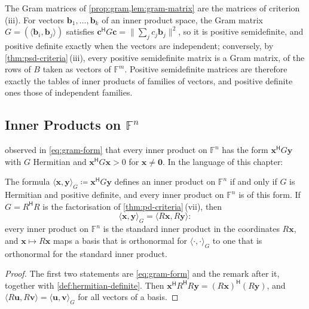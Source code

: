The Gram matrices of \cref{prop:gram,lem:gram-matrix} are the matrices of criterion (iii). For vectors $\mathbf b_1,\ldots,\mathbf b_k$ of an inner product space, the Gram matrix $G=(\langle\mathbf b_i,\mathbf b_j\rangle)$ satisfies $\mathbf c^{\mathsf H}G\mathbf c=\|\sum_jc_j\mathbf b_j\|^2$, so it is positive semidefinite, and positive definite exactly when the vectors are independent; conversely, by \cref{thm:psd-criteria}\,(iii), every positive semidefinite matrix is a Gram matrix, of the rows of $B$ taken as vectors of $\mathbb F^m$. Positive semidefinite matrices are therefore exactly the tables of inner products of families of vectors, and positive definite ones those of independent families.

\subsection{Inner Products on \texorpdfstring{$\mathbb F^n$}{Fn}}

 observed in \eqref{eq:gram-form} that every inner product on $\mathbb F^n$ has the form $\mathbf x^{\mathsf H}G\mathbf y$ with $G$ Hermitian and $\mathbf x^{\mathsf H}G\mathbf x>0$ for $\mathbf x\ne\mathbf 0$. In the language of this chapter:

\begin{corollary}
\label{cor:inner-products-pd}
The formula $\langle\mathbf x,\mathbf y\rangle_G\coloneqq\mathbf x^{\mathsf H}G\mathbf y$ defines an inner product on $\mathbb F^n$ if and only if $G$ is Hermitian and positive definite, and every inner product on $\mathbb F^n$ is of this form. If $G=R^{\mathsf H}R$ is the factorisation of \cref{thm:pd-criteria}\,(vii), then
\[
\langle\mathbf x,\mathbf y\rangle_G=\langle R\mathbf x,R\mathbf y\rangle :
\]
every inner product on $\mathbb F^n$ is the standard inner product in the coordinates $R\mathbf x$, and $\mathbf x\mapsto R\mathbf x$ maps a basis that is orthonormal for $\langle\cdot,\cdot\rangle_G$ to one that is orthonormal for the standard inner product.
\end{corollary}

\begin{proof}
The first two statements are \eqref{eq:gram-form} and the remark after it, together with \cref{def:hermitian-definite}. Then $\mathbf x^{\mathsf H}R^{\mathsf H}R\mathbf y=(R\mathbf x)^{\mathsf H}(R\mathbf y)$, and $\langle R\mathbf u,R\mathbf v\rangle=\langle\mathbf u,\mathbf v\rangle_G$ for all vectors of a basis.
\end{proof}

